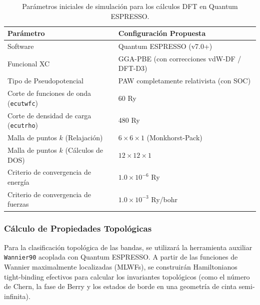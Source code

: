 \begin{table}[htbp]
    \centering
    \caption{Parámetros iniciales de simulación para los cálculos DFT en Quantum ESPRESSO.}
    \label{tab:dft_parameters}
    \begin{tabular}{ll}
        \toprule
        \textbf{Parámetro} & \textbf{Configuración Propuesta} \\
        \midrule
        Software & Quantum ESPRESSO (v7.0+) \\
        Funcional XC & GGA-PBE (con correcciones vdW-DF / DFT-D3) \\
        Tipo de Pseudopotencial & PAW completamente relativista (con SOC) \\
        Corte de funciones de onda (\texttt{ecutwfc}) & 60 Ry \\
        Corte de densidad de carga (\texttt{ecutrho}) & 480 Ry \\
        Malla de puntos $k$ (Relajación) & $6 \times 6 \times 1$ (Monkhorst-Pack) \\
        Malla de puntos $k$ (Cálculos de DOS) & $12 \times 12 \times 1$ \\
        Criterio de convergencia de energía & $1.0 \times 10^{-6}$ Ry \\
        Criterio de convergencia de fuerzas & $1.0 \times 10^{-3}$ Ry/bohr \\
        \bottomrule
    \end{tabular}
\end{table}

\subsubsection{Cálculo de Propiedades Topológicas}
Para la clasificación topológica de las bandas, se utilizará la herramienta auxiliar \texttt{Wannier90} acoplada con Quantum ESPRESSO. A partir de las funciones de Wannier maximalmente localizadas (MLWFs), se construirán Hamiltonianos tight-binding efectivos para calcular los invariantes topológicos (como el número de Chern, la fase de Berry y los estados de borde en una geometría de cinta semi-infinita).
